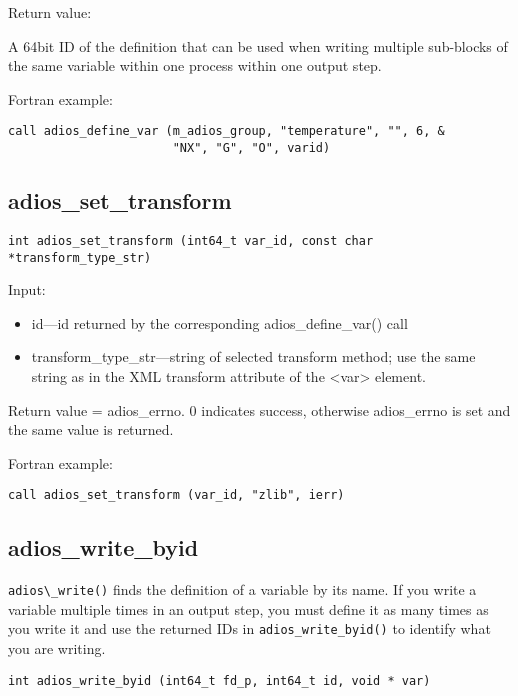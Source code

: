 Return value:

A 64bit ID of the definition that can be used when writing multiple sub-blocks 
of the same variable within one process within one output step. 

Fortran example: 
\begin{lstlisting}[alsolanguage=Fortran,caption={},label={}]
call adios_define_var (m_adios_group, "temperature", "", 6, &
                       "NX", "G", "O", varid)
\end{lstlisting}

\subsection{adios\_set\_transform}

\begin{lstlisting}[alsolanguage=C,caption={},label={}]
int adios_set_transform (int64_t var_id, const char *transform_type_str)
\end{lstlisting}

Input:
\begin{itemize}
\item id---id returned by the corresponding adios\_define\_var() call
\item transform\_type\_str---string of selected transform method; use the same string as in the XML transform attribute of the <var> element.
\end{itemize}

Return value = adios\_errno. 0 indicates success, otherwise adios\_errno is set and the same value is returned. 

Fortran example: 
\begin{lstlisting}[alsolanguage=Fortran,caption={},label={}]
call adios_set_transform (var_id, "zlib", ierr)
\end{lstlisting}


\subsection{adios\_write\_byid}
\verb+adios\_write()+ finds the definition of a variable by its name. If you write
a variable multiple times in an output step, you must define it as many times as you
write it and use the returned IDs in \verb+adios_write_byid()+ to identify what you
are writing.

\begin{lstlisting}[alsolanguage=C,caption={},label={}]
int adios_write_byid (int64_t fd_p, int64_t id, void * var)
\end{lstlisting}

